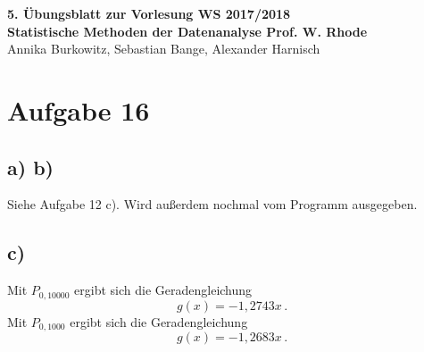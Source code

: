 \documentclass[a4paper, 11pt]{article}
\begin{document}
\noindent
\large{\textbf{5. Übungsblatt zur Vorlesung \hfill WS 2017/2018 \\
Statistische Methoden der Datenanalyse \hfill Prof. W. Rhode}} \\
Annika Burkowitz, Sebastian Bange, Alexander Harnisch \\
\noindent\makebox[\linewidth]{\rule{\textwidth}{0.4pt}}

\section*{Aufgabe 16}
\subsection*{a) b)}
Siehe Aufgabe 12 c). Wird außerdem nochmal vom Programm ausgegeben.

\subsection*{c)}
Mit $P_{0, 10000}$ ergibt sich die Geradengleichung
\begin{equation}
    g(x) = -1,2743x\,.
\end{equation}
Mit $P_{0, 1000}$ ergibt sich die Geradengleichung
\begin{equation}
    g(x) = -1,2683x\,.
\end{equation}
\end{document}
